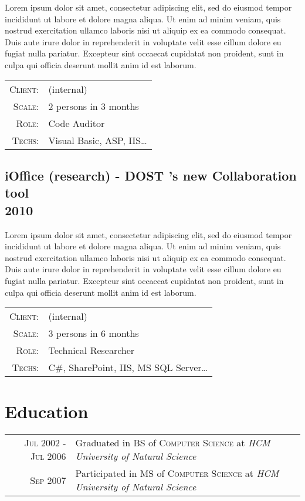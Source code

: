 \documentclass[a4paper,10pt]{article}
\begin{document}
Lorem ipsum dolor sit amet, consectetur adipiscing elit, sed do eiusmod tempor incididunt ut labore et dolore magna aliqua. Ut enim ad minim veniam, quis nostrud exercitation ullamco laboris nisi ut aliquip ex ea commodo consequat. Duis aute irure dolor in reprehenderit in voluptate velit esse cillum dolore eu fugiat nulla pariatur. Excepteur sint occaecat cupidatat non proident, sunt in culpa qui officia deserunt mollit anim id est laborum.

\begin{tabular}{rl}
    \textsc{Client:} & \small(internal) \\
    \textsc{Scale:} & 2 persons in 3 months\\
    \textsc{Role:} & Code Auditor\\
    \textsc{Techs:} & Visual Basic, ASP, IIS\ldots\\
\end{tabular}

\subsection*{iOffice (research) - DOST 's new Collaboration tool\\\small 2010}

Lorem ipsum dolor sit amet, consectetur adipiscing elit, sed do eiusmod tempor incididunt ut labore et dolore magna aliqua. Ut enim ad minim veniam, quis nostrud exercitation ullamco laboris nisi ut aliquip ex ea commodo consequat. Duis aute irure dolor in reprehenderit in voluptate velit esse cillum dolore eu fugiat nulla pariatur. Excepteur sint occaecat cupidatat non proident, sunt in culpa qui officia deserunt mollit anim id est laborum.

\begin{tabular}{rl}
    \textsc{Client:} & \small(internal) \\
    \textsc{Scale:} & 3 persons in 6 months\\
    \textsc{Role:} & Technical Researcher\\
    \textsc{Techs:} & C\#, SharePoint, IIS, MS SQL Server\ldots\\
\end{tabular}

\hfill
\section{Education}
\begin{tabular}{rl}
  \textsc{Jul} 2002 - \textsc{Jul} 2006 & Graduated in BS of \textsc{Computer Science} at \textit{HCM University of Natural Science}\\
  \textsc{Sep} 2007 & Participated in MS of \textsc{Computer Science} at \textit{HCM University of Natural Science}\\
\end{tabular}
\end{document}
